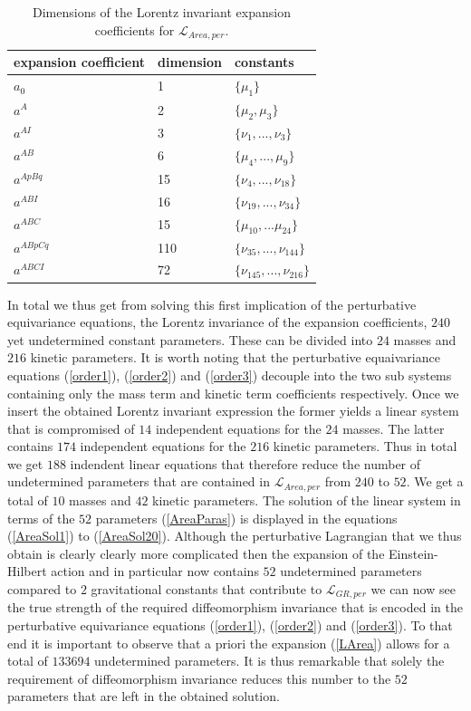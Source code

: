 \documentclass[a4paper,12pt, DIV=14, BCOR=5mm, twoside, headsepline, numbers=noenddot]{scrbook}
\begin{document}
\begin{table}
\centering 
\begin{tabular}{lll} \toprule
    expansion coefficient & dimension & constants   \\ \midrule
    $a_0$ & 1 & $\{\mu_1\}$ \\
    $a^A$ & 2 & $\{\mu_2,\mu_3\}$ \\
    $a^{AI}$ & 3 & $\{\nu_1,..., \nu_3\}$ \\
    $a^{AB}$ & 6 & $\{\mu_4,..., \mu_9 \} $ \\
    $a^{ApBq}$ & 15 & $\{\nu_4,...,\nu_{18}\}$ \\
    $a^{ABI}$ & 16 & $\{ \nu_{19},...,\nu_{34} \}$ \\
    $a^{ABC}$ & 15 & $\{ \mu_{10},...\mu_{24} \}$\\
    $a^{ABpCq}$ & 110 & $\{\nu_{35},...,\nu_{144} \}$ \\
    $a^{ABCI}$ & 72 & $\{ \nu_{145},...,\nu_{216}\}$ \\ \bottomrule
\end{tabular}
\caption{Dimensions of the Lorentz invariant expansion coefficients for $\mathcal{L}_{Area,per}$.}\label{AreaExp}
\end{table}
In total we thus get from solving this first implication of the perturbative equivariance equations, the Lorentz invariance of the expansion coefficients, $240$ yet undetermined constant parameters. These can be divided into $24$ masses and $216$ kinetic parameters. It is worth noting that the perturbative equaivariance equations (\ref{order1}), (\ref{order2}) and (\ref{order3}) decouple into the two sub systems containing only the mass term and kinetic term coefficients respectively. Once we insert the obtained Lorentz invariant expression the former yields a linear system that is compromised of $14$ independent equations for the $24$ masses. The latter contains $174$ independent equations for the $216$ kinetic parameters. Thus in total we get $188$ indendent linear equations that therefore reduce the number of undetermined parameters that are contained in $\mathcal{L}_{Area,per}$ from $240$ to $52$. We get a total of $10$ masses and $42$ kinetic parameters. The solution of the linear system in terms of the $52$ parameters (\ref{AreaParas}) is displayed in the equations (\ref{AreaSol1}) to (\ref{AreaSol20}). Although the perturbative Lagrangian that we thus obtain is clearly clearly more complicated then the expansion of the Einstein-Hilbert action and in particular now contains $52$ undetermined parameters compared to $2$ gravitational constants that contribute to $\mathcal{L}_{GR,per}$ we can now see the true strength of the required diffeomorphism invariance that is encoded in the perturbative equivariance equations (\ref{order1}), (\ref{order2}) and (\ref{order3}). To that end it is important to observe that a priori the expansion (\ref{LArea}) allows for a total of $133694$ undetermined parameters. It is thus remarkable that solely the requirement of diffeomorphism invariance reduces this number to the $52$ parameters that are left in the obtained solution. \\
\end{document}
